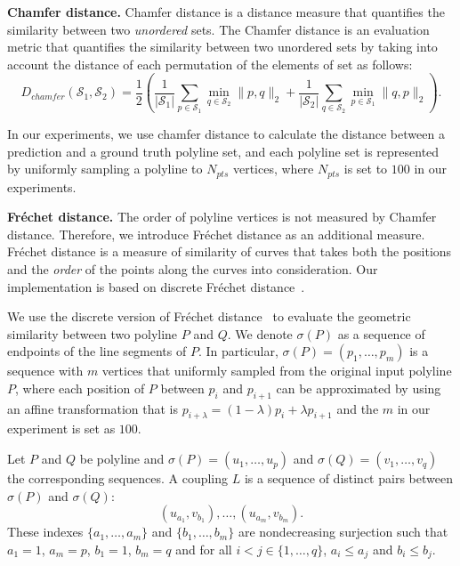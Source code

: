 \documentclass{article}
\theoremstyle{plain}
\theoremstyle{definition}
\theoremstyle{remark}
\begin{document}
\noindent\textbf{Chamfer distance.}
Chamfer distance is a distance measure that quantifies the similarity between two \emph{unordered} sets.
The Chamfer distance is an evaluation metric that quantifies the similarity between two unordered sets by taking into account the distance of each permutation of the elements of set as follows: 
\begin{equation}
    D_{chamfer}(\mathcal{S}_{1}, \mathcal{S}_{2}) = 
        \frac{1}{2}(
            \frac{1}{|\mathcal{S}_{1}|} 
                \sum_{p \in \mathcal{S}_{1}} \mathop{\min}_{q\in\mathcal{S}_{2}} \|p,q\|_2 + 
            \frac{1}{|\mathcal{S}_{2}|} 
                \sum_{q \in \mathcal{S}_{2}} \mathop{\min}_{p\in\mathcal{S}_{1}} \|q,p\|_2) .
\end{equation}

In our experiments, we use chamfer distance to calculate the distance between a prediction and a ground truth polyline set, and each polyline set is represented by uniformly sampling a polyline to $N_{pts}$ vertices, where $N_{pts}$ is set to $100$ in our experiments. 


\noindent\textbf{Fr\'echet distance.}
The order of polyline vertices is not measured by Chamfer distance. Therefore, we introduce Fr\'echet distance as an additional measure. Fr\'echet distance is a measure of similarity of curves that takes both the positions and the \emph{order} of the points along the curves into consideration. Our implementation is based on discrete Fr\'echet distance~\citep{eiter1994computing,agarwal2014computing}. 

We use the discrete version of Fr\'echet distance~\citep{eiter1994computing,agarwal2014computing} to evaluate the geometric similarity between two polyline $P$ and $Q$. We denote $\sigma(P)$ as a sequence of endpoints of the line segments of $P$. In particular, $\sigma(P)= (p_{1}, \dots, p_{m})$ is a sequence with $m$ vertices that uniformly sampled from the original input polyline $P$, where 
each position of $P$ between $p_i$ and $p_{i+1}$ can be approximated by using an affine transformation that is $p_{i + \lambda} = (1 - \lambda)p_{i} + \lambda p_{i + 1}$ and the $m$ in our experiment is set as $100$.

Let $P$ and $Q$ be polyline and $\sigma(P) = (u_{1}, \dots, u_{p})$ and $\sigma(Q) = (v_{1}, \dots, v_{q})$ the corresponding sequences.
A coupling $L$ is a sequence of distinct pairs between $\sigma(P)$ and $\sigma(Q)$: 
\begin{equation}
(u_{a_1}, v_{b_1}), \dots ,(u_{a_m}, v_{b_m}).
\end{equation}
These indexes $\{a_1,\dots,a_m\}$ and $\{b_1,\dots,b_m\}$ are nondecreasing surjection such that $a_1 = 1$, $a_m = p$, $b_1 = 1$, $b_m = q$ and for all $ i<j \in \{1, \dots, q\}$, $a_{i}\leq a_{j}$ and $b_{i}\leq b_{j}$.
\end{document}
